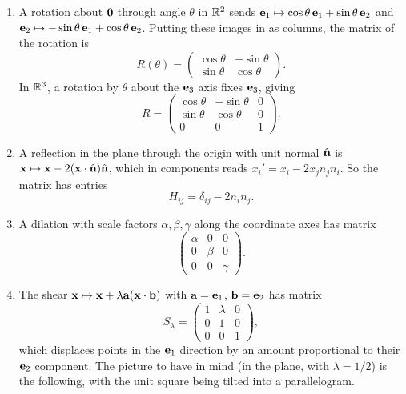 \documentclass[a4paper]{scrartcl}
\begin{document}
\begin{example}
	\begin{enumerate}[label=(\roman*)]
		\item A rotation about $\mathbf{0}$ through angle $\theta$ in $\mathbb{R}^2$ sends $\mathbf{e}_1 \mapsto \cos \theta \, \mathbf{e}_1 + \sin \theta\, \mathbf{e}_2$ and $\mathbf{e}_2 \mapsto -\sin \theta \,\mathbf{e}_1 + \cos \theta\, \mathbf{e}_2$. Putting these images in as columns, the matrix of the rotation is
		$$
		R(\theta) = \begin{pmatrix}
			\cos \theta & - \sin \theta \\
			\sin \theta & \cos \theta
		\end{pmatrix}.
		$$
		In $\mathbb{R}^3$, a rotation by $\theta$ about the $\mathbf{e}_3$ axis fixes $\mathbf{e}_3$, giving
		$$
		R = \begin{pmatrix}
			\cos \theta & - \sin \theta & 0\\
			\sin \theta & \cos \theta & 0 \\
			0 & 0 & 1
		\end{pmatrix}.
		$$
		\item A reflection in the plane through the origin with unit normal $\hat{\mathbf{n}}$ is $\mathbf{x} \mapsto \mathbf{x} - 2 (\mathbf{x} \cdot \hat{\mathbf{n}}) \hat{\mathbf{n}}$, which in components reads $x_i' = x_i - 2 x_j n_j n_i$. So the matrix has entries
		$$
		H_{ij} = \delta_{ij} - 2 n_i n_j.
		$$
		\item A dilation with scale factors $\alpha, \beta, \gamma$ along the coordinate axes has matrix
		$$
		\begin{pmatrix}
			\alpha & 0 & 0 \\
			0 & \beta & 0 \\
			0 & 0 & \gamma
		\end{pmatrix}.
		$$
		\item The shear $\mathbf{x} \mapsto \mathbf{x} + \lambda \mathbf{a}(\mathbf{x} \cdot \mathbf{b})$ with $\mathbf{a} = \mathbf{e}_1$, $\mathbf{b} = \mathbf{e}_2$ has matrix
		$$
		S_\lambda = \begin{pmatrix}
			1 & \lambda & 0 \\
			0 & 1 & 0 \\
			0 & 0 & 1
		\end{pmatrix},
		$$
		which displaces points in the $\mathbf{e}_1$ direction by an amount proportional to their $\mathbf{e}_2$ component. The picture to have in mind (in the plane, with $\lambda = 1/2$) is the following, with the unit square being tilted into a parallelogram.


\end{enumerate}
\end{example}
\end{document}
